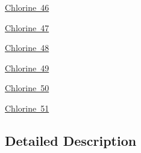 \begin{DoxyCompactItemize}
\item 
\mbox{\hyperlink{group___isotope_const-_chlorine-_cl46}{Chlorine 46}}
\item 
\mbox{\hyperlink{group___isotope_const-_chlorine-_cl47}{Chlorine 47}}
\item 
\mbox{\hyperlink{group___isotope_const-_chlorine-_cl48}{Chlorine 48}}
\item 
\mbox{\hyperlink{group___isotope_const-_chlorine-_cl49}{Chlorine 49}}
\item 
\mbox{\hyperlink{group___isotope_const-_chlorine-_cl50}{Chlorine 50}}
\item 
\mbox{\hyperlink{group___isotope_const-_chlorine-_cl51}{Chlorine 51}}
\end{DoxyCompactItemize}


\subsection{Detailed Description}
